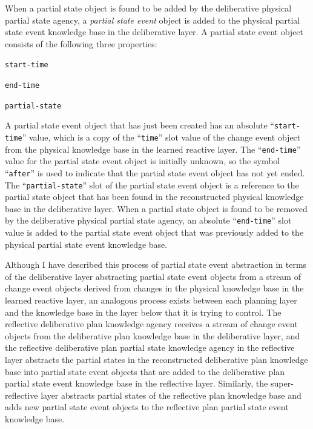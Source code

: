 When a partial state object is found to be added by the deliberative
physical partial state agency, a {\emph{partial state event}} object
is added to the physical partial state event knowledge base in the
deliberative layer.  A partial state event object consists of the
following three properties:
\begin{packed_enumerate}
\item{{\tt{start-time}}}
\item{{\tt{end-time}}}
\item{{\tt{partial-state}}}
\end{packed_enumerate}
A partial state event object that has just been created has an
absolute ``{\tt{start-time}}'' value, which is a copy of the
``{\tt{time}}'' slot value of the change event object from the
physical knowledge base in the learned reactive layer.  The
``{\tt{end-time}}'' value for the partial state event object is
initially unknown, so the symbol ``{\tt{after}}'' is used to indicate
that the partial state event object has not yet ended.  The
``{\tt{partial-state}}'' slot of the partial state event object is a
reference to the partial state object that has been found in the
reconstructed physical knowledge base in the deliberative layer.  When
a partial state object is found to be removed by the deliberative
physical partial state agency, an absolute ``{\tt{end-time}}'' slot
value is added to the partial state event object that was previously
added to the physical partial state event knowledge base.

Although I have described this process of partial state event
abstraction in terms of the deliberative layer abstracting partial
state event objects from a stream of change event objects derived from
changes in the physical knowledge base in the learned reactive layer,
an analogous process exists between each planning layer and the
knowledge base in the layer below that it is trying to control.  The
reflective deliberative plan knowledge agency receives a stream of
change event objects from the deliberative plan knowledge base in the
deliberative layer, and the reflective deliberative plan partial state
knowledge agency in the reflective layer abstracts the partial states
in the reconstructed deliberative plan knowledge base into partial
state event objects that are added to the deliberative plan partial
state event knowledge base in the reflective layer.  Similarly, the
super-reflective layer abstracts partial states of the reflective plan
knowledge base and adds new partial state event objects to the
reflective plan partial state event knowledge base.

